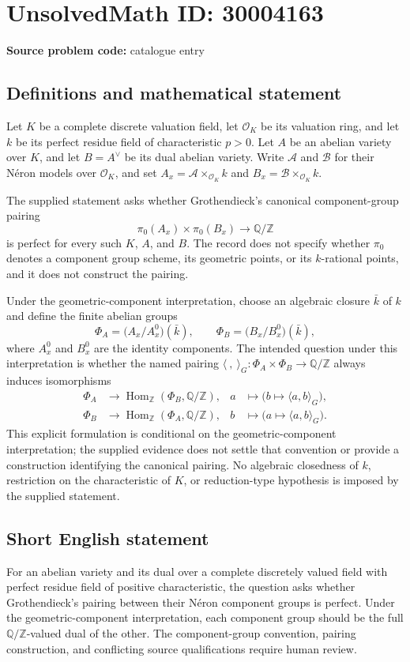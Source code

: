 \documentclass[11pt]{article}
\newcommand{\Z}{\mathbb{Z}}
\newcommand{\Q}{\mathbb{Q}}
\begin{document}
\section*{UnsolvedMath ID: 30004163}
\textbf{Source problem code:} catalogue entry
\subsection{Definitions and mathematical statement}
Let \(K\) be a complete discrete valuation field, let \(\mathcal O_K\) be its valuation ring, and let \(k\) be its perfect residue field of characteristic \(p>0\). Let \(A\) be an abelian variety over \(K\), and let \(B=A^\vee\) be its dual abelian variety. Write \(\mathcal A\) and \(\mathcal B\) for their Néron models over \(\mathcal O_K\), and set \(A_x=\mathcal A\times_{\mathcal O_K}k\) and \(B_x=\mathcal B\times_{\mathcal O_K}k\).

The supplied statement asks whether Grothendieck's canonical component-group pairing
\[
\pi_0(A_x)\times\pi_0(B_x)\longrightarrow\Q/\Z
\]
is perfect for every such \(K\), \(A\), and \(B\). The record does not specify whether \(\pi_0\) denotes a component group scheme, its geometric points, or its \(k\)-rational points, and it does not construct the pairing.

Under the geometric-component interpretation, choose an algebraic closure \(\bar k\) of \(k\) and define the finite abelian groups
\[
\Phi_A=\bigl(A_x/A_x^0\bigr)(\bar k),\qquad
\Phi_B=\bigl(B_x/B_x^0\bigr)(\bar k),
\]
where \(A_x^0\) and \(B_x^0\) are the identity components. The intended question under this interpretation is whether the named pairing \(\langle\ ,\ \rangle_G:\Phi_A\times\Phi_B\to\Q/\Z\) always induces isomorphisms
\[
\begin{aligned}
\Phi_A&\longrightarrow\operatorname{Hom}_{\Z}(\Phi_B,\Q/\Z),
& a&\longmapsto\bigl(b\longmapsto\langle a,b\rangle_G\bigr),\\
\Phi_B&\longrightarrow\operatorname{Hom}_{\Z}(\Phi_A,\Q/\Z),
& b&\longmapsto\bigl(a\longmapsto\langle a,b\rangle_G\bigr).
\end{aligned}
\]
This explicit formulation is conditional on the geometric-component interpretation; the supplied evidence does not settle that convention or provide a construction identifying the canonical pairing. No algebraic closedness of \(k\), restriction on the characteristic of \(K\), or reduction-type hypothesis is imposed by the supplied statement.
\subsection{Short English statement}
For an abelian variety and its dual over a complete discretely valued field with perfect residue field of positive characteristic, the question asks whether Grothendieck's pairing between their Néron component groups is perfect. Under the geometric-component interpretation, each component group should be the full \(\Q/\Z\)-valued dual of the other. The component-group convention, pairing construction, and conflicting source qualifications require human review.
\end{document}
